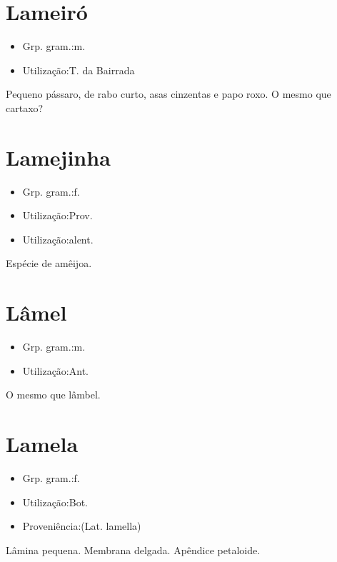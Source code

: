 \section{Lameiró}
\begin{itemize}
\item {Grp. gram.:m.}
\end{itemize}
\begin{itemize}
\item {Utilização:T. da Bairrada}
\end{itemize}
Pequeno pássaro, de rabo curto, asas cinzentas e papo roxo.
O mesmo que \textunderscore cartaxo\textunderscore ?
\section{Lamejinha}
\begin{itemize}
\item {Grp. gram.:f.}
\end{itemize}
\begin{itemize}
\item {Utilização:Prov.}
\end{itemize}
\begin{itemize}
\item {Utilização:alent.}
\end{itemize}
Espécie de amêijoa.
\section{Lâmel}
\begin{itemize}
\item {Grp. gram.:m.}
\end{itemize}
\begin{itemize}
\item {Utilização:Ant.}
\end{itemize}
O mesmo que \textunderscore lâmbel\textunderscore .
\section{Lamela}
\begin{itemize}
\item {Grp. gram.:f.}
\end{itemize}
\begin{itemize}
\item {Utilização:Bot.}
\end{itemize}
\begin{itemize}
\item {Proveniência:(Lat. \textunderscore lamella\textunderscore )}
\end{itemize}
Lâmina pequena.
Membrana delgada.
Apêndice petaloide.
